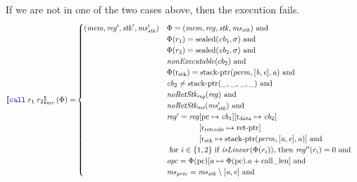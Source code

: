 \documentclass[a4paper]{article}
\newcommand{\sem}[1]{\left\llbracket #1 \right\rrbracket}
\newcommand{\ssem}[2][\Phi]{\sem{#2}_{\mathrm{src}}(#1)}
\newcommand{\sourcecolor}[1]{\color{blue}}
\newcommand{\src}[1]{{\sourcecolor{} #1}}
\newcommand{\zinstr}[1]{\texttt{#1}}
\newcommand{\twoinstr}[3]{
  \ifthenelse{\equal{#2#3}{}}
  {\zinstr{#1}}
  {\zinstr{#1} \; #2 \; #3}
}
\newcommand{\scall}[2]{\twoinstr{\src{call}}{#1}{#2}}
\newcommand{\update}[2]{[#1 \mapsto #2]}
\newcommand{\shareddom}[1]{\mathrm{#1}}
\newcommand{\perm}{\var{perm}}
\newcommand{\stkptr}[1]{\mathrm{stack\text{-}ptr}(#1)}
\newcommand{\retptr}{\mathrm{ret\text{-}ptr}}
\newcommand{\sealed}[1]{\shareddom{sealed}(#1)}
\newcommand{\var}[1]{\mathit{#1}}
\newcommand{\reg}{\var{reg}}
\newcommand{\mem}{\var{mem}}
\newcommand{\ms}{\var{ms}}
\newcommand{\stk}{\var{stk}}
\newcommand{\priv}{\var{priv}}
\newcommand{\opc}{\var{opc}}
\newcommand{\cb}{\var{cb}}
\newcommand{\baddr}{\var{b}}
\newcommand{\eaddr}{\var{e}}
\newcommand{\aaddr}{\var{a}}
\newcommand{\stdrng}{[\baddr,\eaddr]}
\newcommand{\constant}[1]{\mathrm{#1}}
\newcommand{\calllen}{\constant{call\_len}}
\newcommand{\pcreg}{\mathrm{pc}}
\newcommand{\rstk}{\mathrm{r}_\mathrm{stk}}
\newcommand{\rretc}{\mathrm{r}_\mathrm{ret code}}
\newcommand{\rdata}{\mathrm{r}_\mathrm{data}}
\newcommand{\plainfun}[2]{
  \ifthenelse{\equal{#2}{}}
  {\mathit{#1}}
  {\mathit{#1}(#2)}
}
\newcommand{\nonExec}[1]{\plainfun{nonExecutable}{#1}}
\newcommand{\isLinear}[1]{\plainfun{isLinear}{#1}}
\newcommand{\noRetStkReg}[1]{\plainfun{noRetStk_{reg}}{#1}}
\newcommand{\noRetStkMs}[1]{\plainfun{noRetStk_{ms}}{#1}}
\begin{document}
If we are not in one of the two cases above, then the execution fails.
\begin{align*}
  \ssem{\scall{r_1}{r_2}} = & 
    \begin{cases}
      (\mem,\reg',\stk',\ms_\stk') & \arraycolsep=0pt
                                      \begin{array}[t]{l}
                                        \Phi = (\mem,\reg,\stk,\ms_\stk) \text{ and } \\
                                        \Phi(r_1) = \sealed{\cb_1,\sigma} \text{ and } \\
                                        \Phi(r_2) = \sealed{\cb_2,\sigma} \text{ and } \\
                                        \nonExec{cb_2} \text{ and } \\
                                        \Phi(\rstk) = \stkptr{\perm, \stdrng, \aaddr} \text{ and } \\
                                        \cb_2 \neq \stkptr{\_,\_,\_,\_} \text{ and } \\
                                        \noRetStkReg{\reg} \text{ and } \\
                                        \noRetStkMs{\ms_\stk'} \text{ and } \\
                                        \reg' = \reg
                                        \begin{array}[t]{l}
                                        \update{\pcreg}{\cb_1}\update{\rdata}{\cb_2}\\
                                        \update{\rretc}{\retptr}\\
                                        \update{\rstk}{\stkptr{\perm,[\aaddr,\eaddr],\aaddr}} \text{ and }
                                        \end{array}
\\                                        \text{ for $i \in \{1,2\}$ if $\isLinear{\Phi(r_i)}$, then $\reg''(r_i) = 0$ and} \\
                                        \opc = \Phi(\pcreg)\update{a}{\Phi(\pcreg).a+\calllen} \text{ and } \\
                                        \ms_\priv = \ms_\stk \setminus [\aaddr,\eaddr] \text{ and } \\

\end{array}
\end{cases}
\end{align*}
\end{document}
